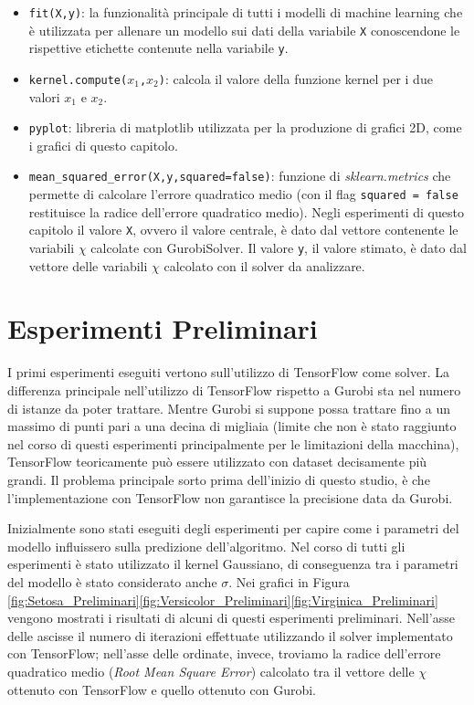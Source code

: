 \documentclass[a4paper,12pt]{report}
\begin{document}
\begin{itemize}
    \item \texttt{fit(X,y)}: la funzionalità principale di tutti i modelli di machine learning che è utilizzata per allenare un modello sui dati della variabile \texttt{X} conoscendone le rispettive etichette contenute nella variabile \texttt{y}.
    \item \texttt{kernel.compute($x_{1}$,$x_{2}$)}: calcola il valore della funzione kernel per i due valori $x_{1}$ e $x_{2}$.
    \item \texttt{pyplot}: libreria di matplotlib utilizzata per la produzione di grafici 2D, come i grafici di questo capitolo.
    \item \texttt{mean\_squared\_error(X,y,squared=false)}: funzione di \textit{sklearn.metrics} che permette di calcolare l'errore quadratico medio (con il flag \texttt{squared = false} restituisce la radice dell'errore quadratico medio). Negli esperimenti di questo capitolo il valore \texttt{X}, ovvero il valore centrale, è dato dal vettore contenente le variabili $\chi$ calcolate con GurobiSolver. Il valore \texttt{y}, il valore stimato, è dato dal vettore delle variabili $\chi$ calcolato con il solver da analizzare.
\end{itemize}

\section{Esperimenti Preliminari}
I primi esperimenti eseguiti vertono sull'utilizzo di TensorFlow come solver. La differenza principale nell'utilizzo di TensorFlow rispetto a Gurobi sta nel numero di istanze da poter trattare. Mentre Gurobi si suppone possa trattare fino a un massimo di punti pari a una decina di migliaia (limite che non è stato raggiunto nel corso di questi esperimenti principalmente per le limitazioni della macchina), TensorFlow teoricamente può essere utilizzato con dataset decisamente più grandi. Il problema principale sorto prima dell'inizio di questo studio, è che l'implementazione con TensorFlow non garantisce la precisione data da Gurobi.

Inizialmente sono stati eseguiti degli esperimenti per capire come i parametri del modello influissero sulla predizione dell'algoritmo. Nel corso di tutti gli esperimenti è stato utilizzato il kernel Gaussiano, di conseguenza tra i parametri del modello è stato considerato anche $\sigma$. Nei grafici in Figura \ref{fig:Setosa_Preliminari}\ref{fig:Versicolor_Preliminari}\ref{fig:Virginica_Preliminari} vengono mostrati i risultati di alcuni di questi esperimenti preliminari. Nell'asse delle ascisse il numero di iterazioni effettuate utilizzando il solver implementato con TensorFlow; nell'asse delle ordinate, invece, troviamo la radice dell'errore quadratico medio (\textit{Root Mean Square Error}) calcolato tra il vettore delle $\chi$ ottenuto con TensorFlow e quello ottenuto con Gurobi.
\end{document}
